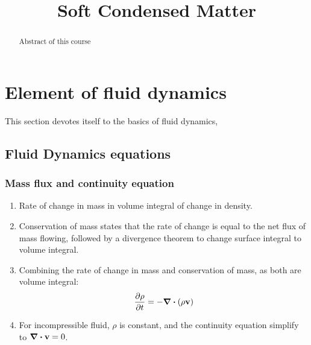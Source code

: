 \documentclass[12pt,a4paper]{article}
\newcommand{\topic}{Soft Condensed Matter}
\begin{document}
\title{\topic}
\begin{titlepage}
    \maketitle
\end{titlepage}

\tableofcontents

\newpage
\begin{abstract}
\noindent
Abstract of this course
\end{abstract}

\section{Element of fluid dynamics}
This section devotes itself to the basics of fluid dynamics,
    \subsection{Fluid Dynamics equations}
        \subsubsection{Mass flux and continuity equation}
            \begin{enumerate}
                \item  Rate of change in mass in volume integral of change in density.
                \item  Conservation of mass states that the rate of change is equal to the net flux of mass flowing, 
                followed by a divergence theorem to change surface integral to volume integral.
                \item Combining the rate of change in mass and conservation of mass, as both are volume integral:            
                \begin{equation}
                    \pdv{\rho}{t} = -\div(\rho \vb{v})
                \end{equation}
                \item For incompressible fluid, $\rho$ is constant, and the continuity equation simplify to $\div\vb{v} = 0$.
            \end{enumerate}
\end{document}
